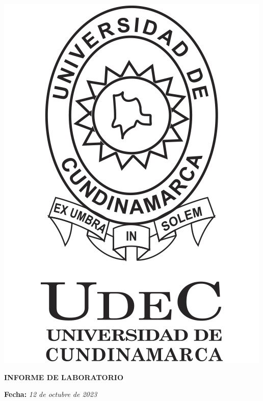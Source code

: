 \onecolumn\begin{@twocolumntrue}
    \begin{minipage}{0.3\textwidth}{\includegraphics[scale=0.18]{fig/ucundinamarca.png}} %
    \end{minipage}
    \vspace{10pt}
    \begin{minipage}{0.677\textwidth}
        \begin{center}
            \vspace{12mm}
        
            \Large{\textbf{INFORME DE LABORATORIO }}
            \vspace{4mm}

            \large{\textbf{Fecha: } \textit{12 de octubre de 2023}}
            \vspace{2mm}
            

\end{center}
\end{minipage}
\end{@twocolumntrue}
